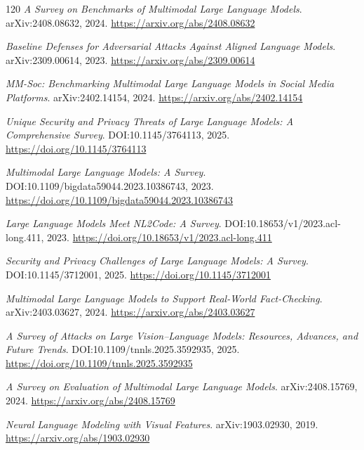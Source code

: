 \documentclass[11pt,a4paper]{article}
\begin{document}
\begin{thebibliography}{120}
\newblock \emph{A Survey on Benchmarks of Multimodal Large Language Models}.
\newblock arXiv:2408.08632, 2024.
\newblock \url{https://arxiv.org/abs/2408.08632}

\newblock \emph{Baseline Defenses for Adversarial Attacks Against Aligned Language Models}.
\newblock arXiv:2309.00614, 2023.
\newblock \url{https://arxiv.org/abs/2309.00614}

\newblock \emph{MM-Soc: Benchmarking Multimodal Large Language Models in Social Media Platforms}.
\newblock arXiv:2402.14154, 2024.
\newblock \url{https://arxiv.org/abs/2402.14154}

\newblock \emph{Unique Security and Privacy Threats of Large Language Models: A Comprehensive Survey}.
\newblock DOI:10.1145/3764113, 2025.
\newblock \url{https://doi.org/10.1145/3764113}

\newblock \emph{Multimodal Large Language Models: A Survey}.
\newblock DOI:10.1109/bigdata59044.2023.10386743, 2023.
\newblock \url{https://doi.org/10.1109/bigdata59044.2023.10386743}

\newblock \emph{Large Language Models Meet NL2Code: A Survey}.
\newblock DOI:10.18653/v1/2023.acl-long.411, 2023.
\newblock \url{https://doi.org/10.18653/v1/2023.acl-long.411}

\newblock \emph{Security and Privacy Challenges of Large Language Models: A Survey}.
\newblock DOI:10.1145/3712001, 2025.
\newblock \url{https://doi.org/10.1145/3712001}

\newblock \emph{Multimodal Large Language Models to Support Real-World Fact-Checking}.
\newblock arXiv:2403.03627, 2024.
\newblock \url{https://arxiv.org/abs/2403.03627}

\newblock \emph{A Survey of Attacks on Large Vision--Language Models: Resources, Advances, and Future Trends}.
\newblock DOI:10.1109/tnnls.2025.3592935, 2025.
\newblock \url{https://doi.org/10.1109/tnnls.2025.3592935}

\newblock \emph{A Survey on Evaluation of Multimodal Large Language Models}.
\newblock arXiv:2408.15769, 2024.
\newblock \url{https://arxiv.org/abs/2408.15769}

\newblock \emph{Neural Language Modeling with Visual Features}.
\newblock arXiv:1903.02930, 2019.
\newblock \url{https://arxiv.org/abs/1903.02930}


\end{thebibliography}
\end{document}
